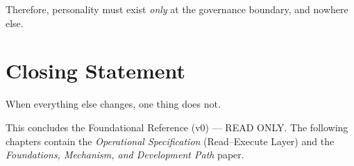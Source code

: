 Therefore, personality must exist \emph{only} at the governance
boundary, and nowhere else.

\section*{Closing Statement}
\label{sec:foundational-closing}

When everything else changes, one thing does not.


\medskip
\noindent
This concludes the Foundational Reference (v0) --- READ ONLY. The
following chapters contain the \emph{Operational Specification}
(Read--Execute Layer) and the \emph{Foundations, Mechanism, and
Development Path} paper.
